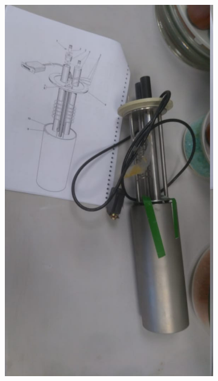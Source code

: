 \begin{figure}[h]
		\begin{subfigure}{0.24\linewidth}
			\includegraphics[width=\linewidth]{Figures/process/holder}
			\caption{ }
			\label{fig: subB}
		\end{subfigure}
		\begin{subfigure}{0.24\linewidth}

\end{subfigure}
\end{figure}
